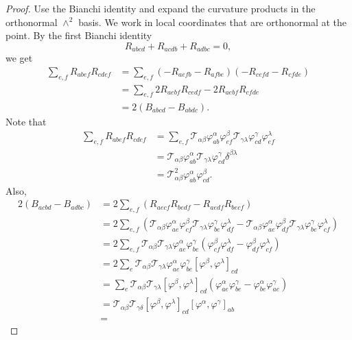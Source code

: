 \begin{proof}
\sketch Use the Bianchi identity and expand the curvature products in the
orthonormal $\wedge^2$ basis.
We work in local coordinates that are orthonormal at
the point. By the first Bianchi identity $$R_{abcd}+ R_{acdb}+
R_{adbc} = 0,$$ we get
\begin{align*}
\sum_{e,f}R_{abef}R_{cdef} &=
\sum_{e,f}(-R_{aefb}-R_{afbe})(-R_{cefd}-R_{cfde})\\& =
\sum_{e,f}2R_{aebf}R_{cedf}-2R_{aebf}R_{cfde}\\& = 2(B_{abcd} -
B_{abdc}).
\end{align*}
Note that
\begin{align*}
\sum_{e,f}R_{abef}R_{cdef}& =
\sum_{e,f}{\mathcal T}_{\alpha\beta}\varphi^{\alpha}_{ab}\varphi^{\beta}_{ef}
{\mathcal T}_{\gamma\lambda}\varphi^{\gamma}_{cd}\varphi^{\lambda}_{ef}\\
&={\mathcal T}_{\alpha\beta}\varphi^{\alpha}_{ab}{\mathcal
T}_{\gamma\lambda}\varphi^{\gamma}_{cd}\delta^{\beta\lambda}\\& =
{\mathcal
T}^{2}_{\alpha\beta}\varphi^{\alpha}_{ab}\varphi^{\beta}_{cd}.
\end{align*}
Also,
\begin{align*}
2(B_{acbd}-B_{adbc}) &= 2\sum_{e,f}(R_{aecf}R_{bedf} -
R_{aedf}R_{becf})\\& = 2\sum_{e,f}({\mathcal
T}_{\alpha\beta}\varphi^{\alpha}_{ae}\varphi^{\beta}_{cf}{\mathcal
T}_{\gamma\lambda}\varphi^{\gamma}_{be}\varphi^{\lambda}_{df} -
{\mathcal
T}_{\alpha\beta}\varphi^{\alpha}_{ae}\varphi^{\beta}_{df}{\mathcal
T}_{\gamma\lambda}\varphi^{\gamma}_{be}\varphi^{\lambda}_{cf})
\\&=
2\sum_{e,f}{\mathcal T}_{\alpha\beta}{\mathcal
T}_{\gamma\lambda}\varphi^{\alpha}_{ae}\varphi^{\gamma}_{be}(\varphi^{\beta}_{cf}\varphi^{\lambda}_{df}-\varphi^{\beta}_{df}\varphi^{\lambda}_{cf})
\\&=2\sum_e{\mathcal T}_{\alpha\beta}{\mathcal T}_{\gamma\lambda}\varphi^{\alpha}_{ae}
\varphi^{\gamma}_{be}[\varphi^{\beta},\varphi^{\lambda}]_{cd}
\\&=
\sum_e{\mathcal T}_{\alpha\beta}{\mathcal
T}_{\gamma\lambda}[\varphi^{\beta},\varphi^{\lambda}]_{cd}
(\varphi^{\alpha}_{ae}\varphi^{\gamma}_{be}
- \varphi^{\alpha}_{be}\varphi^{\gamma}_{ae})
\\&={\mathcal T}_{\alpha\beta}{\mathcal T}_{\gamma\delta}[\varphi^{\beta},\varphi^{\lambda}]_{cd}[\varphi^{\alpha},\varphi^{\gamma}]_{ab}
\\&=

\end{align*}
\end{proof}
